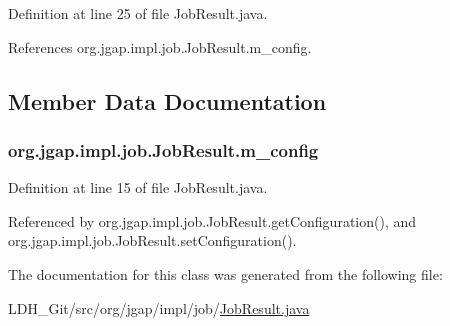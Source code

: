 Definition at line 25 of file Job\-Result.\-java.



References org.\-jgap.\-impl.\-job.\-Job\-Result.\-m\-\_\-config.



\subsection{Member Data Documentation}
\hypertarget{classorg_1_1jgap_1_1impl_1_1job_1_1_job_result_a0e1603af3a6d1b06b7d9abcd917e05d6}{
\subsubsection[{m\-\_\-config}]{ org.\-jgap.\-impl.\-job.\-Job\-Result.\-m\-\_\-config\hspace{0.3cm}{\ttfamily [private]}}}\label{classorg_1_1jgap_1_1impl_1_1job_1_1_job_result_a0e1603af3a6d1b06b7d9abcd917e05d6}


Definition at line 15 of file Job\-Result.\-java.



Referenced by org.\-jgap.\-impl.\-job.\-Job\-Result.\-get\-Configuration(), and org.\-jgap.\-impl.\-job.\-Job\-Result.\-set\-Configuration().



The documentation for this class was generated from the following file\-:\begin{DoxyCompactItemize}
\item 
L\-D\-H\-\_\-\-Git/src/org/jgap/impl/job/\hyperlink{_job_result_8java}{Job\-Result.\-java}\end{DoxyCompactItemize}
